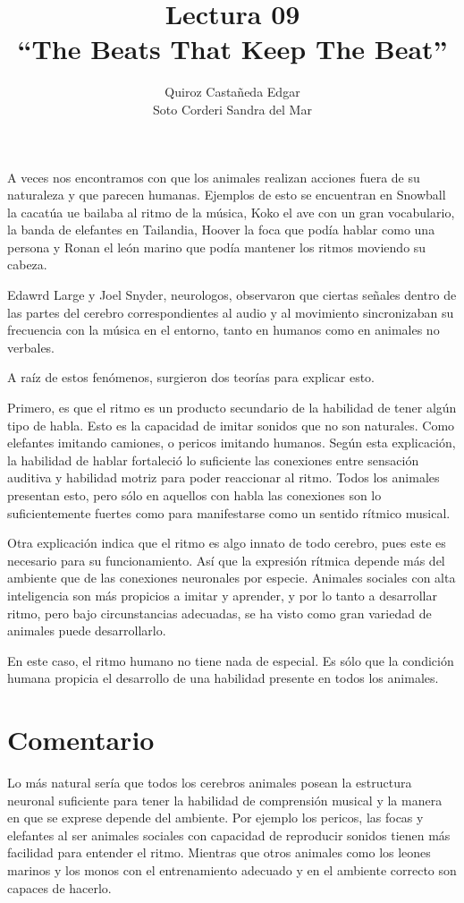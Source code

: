 \documentclass[12pt]{article}
\title{
	Lectura 09\\ 
	``The Beats That Keep The Beat''
	}
\author{
	Quiroz Castañeda Edgar \\
	Soto Corderi Sandra del Mar
	}
\makeatletter
\renewcommand{\maketitle}{
	\bgroup\setlength{\parindent}{0pt}

	\begin{flushright}
		\@author
	\end{flushright}

	\begin{flushleft}
		\textbf{\@title}
	\end{flushleft}

	\egroup
}
\makeatother
\begin{document}
	\maketitle
	
	A veces nos encontramos con que los animales realizan acciones fuera de su naturaleza y que parecen humanas. Ejemplos de esto se encuentran en Snowball la cacatúa ue bailaba al ritmo de la música, Koko el ave con un gran vocabulario, la banda de elefantes en Tailandia, Hoover la foca que podía hablar como una persona y Ronan el león marino que podía mantener los ritmos moviendo su cabeza. 

	Edawrd Large y Joel Snyder, neurologos, observaron que ciertas señales 
	dentro de las partes del cerebro correspondientes al audio y al movimiento
	sincronizaban su frecuencia con la música en el entorno, tanto en humanos 
	como en animales no verbales.

	A raíz de estos fenómenos, surgieron dos teorías para explicar esto.

	Primero, es que el ritmo es un producto secundario de la habilidad de 
	tener algún tipo de habla. Esto es la capacidad de imitar sonidos que no son
	naturales. Como elefantes imitando camiones, o pericos imitando humanos.
	Según esta explicación, la habilidad de hablar fortaleció lo suficiente las 
	conexiones entre sensación auditiva y habilidad motriz para poder reaccionar 
	al ritmo. Todos los animales presentan esto, pero sólo en aquellos con habla
	las conexiones son lo suficientemente fuertes como para manifestarse como 
	un sentido rítmico musical.

	Otra explicación indica que el ritmo es algo innato de todo cerebro, pues 
	este es necesario para su funcionamiento. Así que la expresión rítmica 
	depende más del ambiente que de las conexiones neuronales por especie.
	Animales sociales con alta inteligencia son más propicios a imitar y
	aprender, y por lo tanto a desarrollar ritmo, pero bajo circunstancias 
	adecuadas, se ha visto como gran variedad de animales puede desarrollarlo.

	En este caso, el ritmo humano no tiene nada de especial. Es sólo que la 
	condición humana propicia el desarrollo de una habilidad presente en todos 
	los animales.
	
	\section*{Comentario}
	Lo más natural sería que todos los cerebros animales posean la estructura 
	neuronal suficiente para tener la habilidad de comprensión musical y la 
	manera en que se exprese depende del ambiente. Por ejemplo los pericos, las 
	focas y elefantes al ser animales sociales con capacidad de reproducir 
	sonidos tienen más facilidad para entender el ritmo. Mientras que otros 
	animales como los leones marinos y los monos con el entrenamiento adecuado 
	y en el ambiente correcto son capaces de hacerlo.
	
\end{document}
